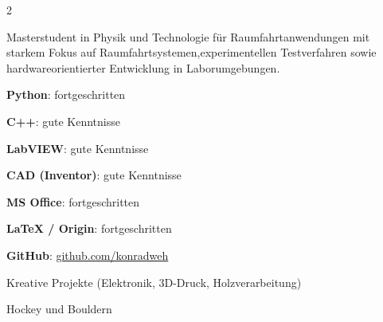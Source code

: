 \documentclass[11pt,a4paper]{article}
\begin{document}
\pagestyle{empty}
\color{cvblack}

\vspace*{\BodyStart}

\columnratio{\LeftColRatio,\dimexpr 1\relax-\LeftColRatio\relax}
\setlength{\columnsep}{\ColSep}

\vspace*{0pt}

\begin{paracol}{2}
\noindent\strut


Masterstudent in Physik und \newline
Technologie für Raumfahrtanwendungen \newline
mit starkem Fokus auf \newline
Raumfahrtsystemen,experimentellen \newline
Testverfahren sowie hardwareorientierter \newline
Entwicklung in Laborumgebungen.


\cvhstripe




\cvhstripe


\textbf{Python}: fortgeschritten
\par
\textbf{C++}: gute Kenntnisse
\par
\textbf{LabVIEW}: gute Kenntnisse
\par
\textbf{CAD (Inventor)}: gute Kenntnisse
\par
\textbf{MS Office}: fortgeschritten
\par
\textbf{LaTeX / Origin}: fortgeschritten
\par
\textbf{GitHub}: \href{https://github.com/konradweh}{github.com/konradweh}


\cvhstripe


Kreative Projekte (Elektronik, \newline
3D-Druck, Holzverarbeitung)
\par
Hockey und Bouldern


\cvhstripe



\end{paracol}
\end{document}
